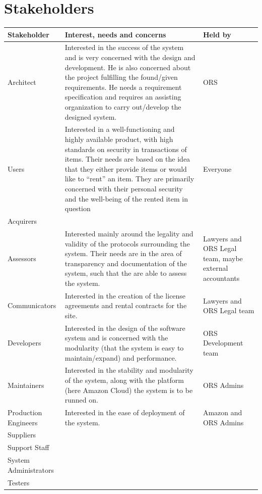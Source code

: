 \documentclass[a4paper,11pt]{report}
\begin{document}
\section{Stakeholders}
\label{sec:stakeholders}
\begin{table}
\begin{center}
    \begin{tabular}[h]{| l |  p{6cm} | l |}
    \hline
    \textbf{Stakeholder} & \textbf{Interest, needs and concerns} & \textbf{Held
        by} \\
    \hline
    Architect & Interested in the success of the system and is very concerned
        with the design and development. He is also concerned about the project 
        fulfilling the found/given requirements. He needs a requirement
        specification and requires an assisting organization to carry
        out/develop the designed system. & ORS \\
    \hline
    Users &  Interested in a well-functioning and highly available product,
        with high standards on security in transactions of items. Their needs
        are based on the idea that they either provide items or would like to
        ``rent'' an item. They are primarily concerned with their personal
        security and the well-being of the rented item in question & Everyone \\
    \hline
    Acquirers &   & \\
    \hline
    Assessors & Interested mainly around the legality and validity of the
        protocols surrounding the system. Their needs are in the area of
        transparency and documentation of the system, such that the are able to
        assess the system. & Lawyers and ORS Legal team, maybe external
        accountants\\
    \hline
    Communicators & Interested in the creation of the license agreements and rental contracts for the site. & Lawyers and ORS Legal team\\
    \hline
    Developers & Interested in the design of the software system and is concerned with the modularity (that the system is easy to maintain/expand) and performance. & ORS Development team\\
    \hline
    Maintainers & Interested in the stability and modularity of the system, along with the platform (here Amazon Cloud) the system is to be runned on. & ORS Admins \\
    \hline
    Production Engineers & Interested in the ease of deployment of the system. & Amazon and ORS Admins\\
    \hline
    Suppliers & & \\
    \hline
    Support Staff & & \\
    \hline
    System Administrators & & \\
    \hline
    Testers & & \\
    \hline
  \end{tabular}
\end{center}
\end{table}
\end{document}
